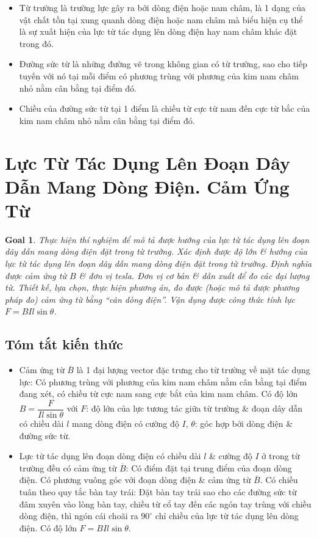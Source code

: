 \documentclass{article}
\newtheorem{goal}{Goal}
\begin{document}
\begin{itemize}
	\item Từ trường là trường lực gây ra bởi dòng điện hoặc nam châm, là 1 dạng của vật chất tồn tại xung quanh dòng điện hoặc nam châm mà biểu hiện cụ thể là sự xuất hiện của lực từ tác dụng lên dòng điện hay nam châm khác đặt trong đó.
	\item Đường sức từ là những đường vẽ trong không gian có từ trường, sao cho tiếp tuyến với nó tại mỗi điểm có phương trùng với phương của kim nam châm nhỏ nằm cân bằng tại điểm đó.
	\item Chiều của đường sức từ tại 1 điểm là chiều từ cực từ nam đến cực từ bắc của kim nam châm nhỏ nằm cân bằng tại điểm đó.
\end{itemize}


\section{Lực Từ Tác Dụng Lên Đoạn Dây Dẫn Mang Dòng Điện. Cảm Ứng Từ}

\begin{goal}
	Thực hiện thí nghiệm để mô tả được hướng của lực từ tác dụng lên đoạn dây dẫn mang dòng điện đặt trong từ trường. Xác định được độ lớn \& hướng của lực từ tác dụng lên đoạn dây dẫn mang dòng điện đặt trong từ trường. Định nghĩa được cảm ứng từ $B$ \& đơn vị tesla. Đơn vị cơ bản \& dẫn xuất để đo các đại lượng từ. Thiết kế, lựa chọn, thực hiện phương án, đo được (hoặc mô tả được phương pháp đo) cảm ứng từ bằng ``cân dòng điện''. Vận dụng được công thức tính lực $F = BIl\sin\theta$.
\end{goal}

\subsection{Tóm tắt kiến thức}

\begin{itemize}
	\item Cảm ứng từ $\overline{B}$ là 1 đại lượng vector đặc trưng cho từ trường về mặt tác dụng lực: Có phương trùng với phương của kim nam châm nằm cân bằng tại điểm đang xét, có chiều từ cực nam sang cực bắt của kim nam châm. Có độ lớn $B = \dfrac{F}{Il\sin\theta}$ với $F$: độ lớn của lực tương tác giữa từ trường \& đoạn dây dẫn có chiều dài $l$ mang dòng điện có cường độ $I$, $\theta$: góc hợp bởi dòng điện \& đường sức từ.
	\item Lực từ tác dụng lên đoạn dòng điện có chiều dài $l$ \& cường độ $I$ ở trong từ trường đều có cảm ứng từ $\overline{B}$: Có điểm đặt tại trung điểm của đoạn dòng điện. Có phương vuông góc với đoạn dòng điện \& cảm ứng từ $\overline{B}$. Có chiều tuân theo quy tắc bàn tay trái: Đặt bàn tay trái sao cho các đường sức từ đâm xuyên vào lòng bàn tay, chiều từ cổ tay đến các ngón tay trùng với chiều dòng điện, thì ngón cái choãi ra $90^\circ$ chỉ chiều của lực từ tác dụng lên dòng điện. Có độ lớn $F = BIl\sin\theta$.
\end{itemize}
\end{document}
